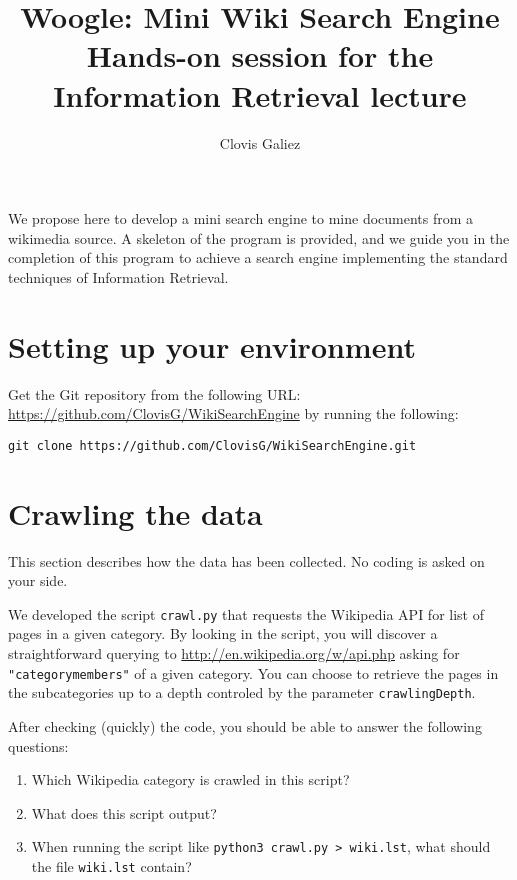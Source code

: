 \documentclass[mathserif, 11pt,c]{article}
\title{Woogle: Mini Wiki Search Engine\\
\Large Hands-on session for the Information Retrieval lecture}
\author{Clovis Galiez}
\begin{document}
\setcounter{secnumdepth}{1} 

\newcommand{\normtwo}[1]{\left|\left|#1\right|\right|_2} 
\newcommand{\normmat}[1]{\left|\left|\left|#1\right|\right|\right|} 
\newcommand{\n}[1]{\lVert #1 \rVert} 
\newcommand{\myd}[2]{ 2\log{\dfrac{\n{#1}.\n{#2}}{#1\cdot #2}}}

\maketitle


We propose here to develop a mini search engine to mine documents from a wikimedia source. A skeleton of the program is provided, and we guide you in the completion of this program to achieve a search engine implementing the standard techniques of Information Retrieval.


\section{Setting up your environment}

Get the Git repository from the following URL: \url{https://github.com/ClovisG/WikiSearchEngine} by running the following:

\texttt{git clone https://github.com/ClovisG/WikiSearchEngine.git}




\section{Crawling the data}



This section describes how the data has been collected. No coding is asked on your side.

We developed the script \texttt{crawl.py} that requests the Wikipedia API for list of pages in a given category. By looking in the script, you will discover a straightforward querying to \url{http://en.wikipedia.org/w/api.php} asking for \texttt{"categorymembers"} of a given category. You can choose to retrieve the pages in the subcategories up to a depth controled by the parameter \texttt{crawlingDepth}.


After checking (quickly) the code, you should be able to answer the following questions:
\begin{enumerate}[label=\textbf{Q\thesection.\arabic*}]
	\item Which Wikipedia category is crawled in this script?
	\item What does this script output?
	\item When running the script like \texttt{python3 crawl.py > wiki.lst}, what should the file \texttt{wiki.lst} contain?
\end{enumerate}
\end{document}
